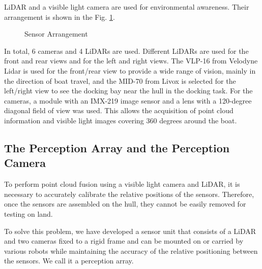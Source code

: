 \documentclass[lettersize,journal]{IEEEtran}
\begin{document}
LiDAR and a visible light camera are used for environmental awareness.
Their arrangement is shown in the Fig. \ref{fig:sensor_arrangement}.

\begin{figure}[H]
  \begin{center}
  \end{center}
  \caption{Sensor Arrangement}
  \label{fig:sensor_arrangement}
\end{figure}

In total, 6 cameras and 4 LiDARs are used.
Different LiDARs are used for the front and rear views and for the left and right views.
The VLP-16 from Velodyne Lidar is used for the front/rear view to provide a wide range of vision, mainly in the direction of boat travel, and the MID-70 from Livox is selected for the left/right view to see the docking bay near the hull in the docking task.
For the cameras, a module with an IMX-219 image sensor and a lens with a 120-degree diagonal field of view was used.
This allows the acquisition of point cloud information and visible light images covering 360 degrees around the boat.

\subsection{The Perception Array and the Perception Camera}

To perform point cloud fusion using a visible light camera and LiDAR, it is necessary to accurately calibrate the relative positions of the sensors.
Therefore, once the sensors are assembled on the hull, they cannot be easily removed for testing on land.

To solve this problem, we have developed a sensor unit that consists of a LiDAR and two cameras fixed to a rigid frame and can be mounted on or carried by various robots while maintaining the accuracy of the relative positioning between the sensors.
We call it a perception array.
\end{document}

